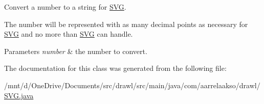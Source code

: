 Convert a number to a string for \hyperlink{classcom_1_1aarrelaakso_1_1drawl_1_1_s_v_g}{S\+VG}. 

The number will be represented with as many decimal points as necessary for \hyperlink{classcom_1_1aarrelaakso_1_1drawl_1_1_s_v_g}{S\+VG} and no more than \hyperlink{classcom_1_1aarrelaakso_1_1drawl_1_1_s_v_g}{S\+VG} can handle.


\begin{DoxyParams}{Parameters}
{\em number} & the number to convert. \\
\hline
\end{DoxyParams}


The documentation for this class was generated from the following file\+:\begin{DoxyCompactItemize}
\item 
/mnt/d/\+One\+Drive/\+Documents/src/drawl/src/main/java/com/aarrelaakso/drawl/\hyperlink{_s_v_g_8java}{S\+V\+G.\+java}\end{DoxyCompactItemize}
